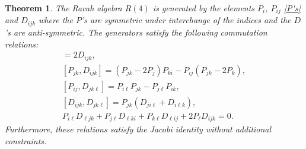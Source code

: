 \documentclass[pdftex]{sigma}
\numberwithin{equation}{section}
\newtheorem{Theorem}{Theorem}[section]
\begin{document}
\begin{Theorem}
\label{bigthm} The Racah algebra $R(4)$ is generated by the elements $P_i$, $P_{ij}$ \eqref{P's} and $D_{ijk}$ where the $P$'s are symmetric under interchange of the indices and the $D$'s are anti-symmetric. The generators satisfy the following commutation relations:
\begin{gather}
[P_{ij}, P_{jk}]=2 D_{ijk}, \label{Ddef}\\
[P_{jk},D_{ijk}]= \left(P_{jk}-2P_j\right)P_{ki}-P_{ij}\left(P_{jk}-2P_{k}\right),\label{innerT}\\
[P_{ij}, D_{jk\ell}] =P_{i\ell}P_{jk}-P_{j\ell}P_{ik},\label{outerT}\\
 [D_{ijk}, D_{jk\ell}] = P_{jk}\left(D_{ji\ell} +D_{i\ell k}\right), \label{DDT}\\
P_{i\ell}D_{\ell jk}+ P_{j\ell} D_{\ell ki}+P_{k\ell}D_{\ell ij}+2P_{\ell}D_{ijk}=0.\label{PDT}
\end{gather}
Furthermore, these relations satisfy the Jacobi identity without additional constraints.
\end{Theorem}
\end{document}
